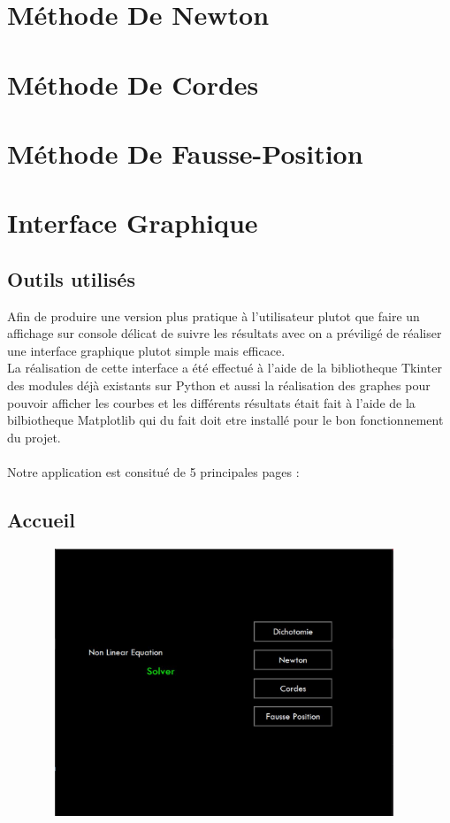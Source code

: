 \documentclass{article}
\begin{document}
\newpage




\section{Méthode De Newton}
\newpage
\section{Méthode De Cordes}
\newpage
\section{Méthode De Fausse-Position}
\newpage
\section{Interface Graphique}
\subsection{Outils utilisés}
Afin de produire une version plus pratique à l'utilisateur plutot que faire un affichage sur console délicat de suivre les résultats avec on a préviligé de réaliser une interface graphique plutot simple mais efficace.\\
La réalisation de cette interface a été effectué à l'aide de la bibliotheque Tkinter des modules déjà existants sur Python et aussi la réalisation des graphes pour pouvoir afficher les courbes et les différents résultats était fait à l'aide de la bilbiotheque Matplotlib qui du fait doit etre installé pour le bon fonctionnement du projet.
\\ \\
Notre application est consitué de 5 principales pages :
\subsection{Accueil}
\includegraphics[width=13cm,height=8cm]{img/accueil.JPG}\\
\end{document}
